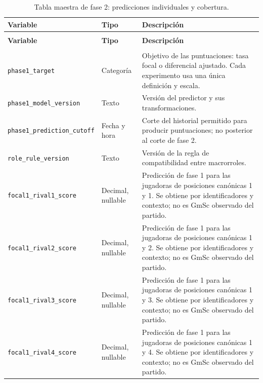 \begin{longtable}{@{}>{\raggedright\arraybackslash}p{5.0cm}>{\raggedright\arraybackslash}p{1.9cm}>{\raggedright\arraybackslash}p{7.7cm}@{}}
\caption{Tabla maestra de fase 2: predicciones individuales y cobertura.}\label{tab:fase2-predicciones}\\
\toprule\textbf{Variable}&\textbf{Tipo}&\textbf{Descripción}\\\midrule\endfirsthead
\multicolumn{3}{l}{\small Continuación de la Tabla~\ref{tab:fase2-predicciones}}\\
\toprule\textbf{Variable}&\textbf{Tipo}&\textbf{Descripción}\\\midrule\endhead
\midrule\multicolumn{3}{r}{\small Continúa en la siguiente página}\\\endfoot
\bottomrule\endlastfoot
\texttt{phase1\_\allowbreak target} & Categoría & Objetivo de las puntuaciones: tasa focal o diferencial ajustado. Cada experimento usa una única definición y escala.\\
\texttt{phase1\_\allowbreak model\_\allowbreak version} & Texto & Versión del predictor y sus transformaciones.\\
\texttt{phase1\_\allowbreak prediction\_\allowbreak cutoff} & Fecha y hora & Corte del historial permitido para producir puntuaciones; no posterior al corte de fase 2.\\
\texttt{role\_\allowbreak rule\_\allowbreak version} & Texto & Versión de la regla de compatibilidad entre macrorroles.\\
\texttt{focal1\_\allowbreak rival1\_\allowbreak score} & Decimal, nullable & Predicción de fase 1 para las jugadoras de posiciones canónicas 1 y 1. Se obtiene por identificadores y contexto; no es GmSc observado del partido.\\
\texttt{focal1\_\allowbreak rival2\_\allowbreak score} & Decimal, nullable & Predicción de fase 1 para las jugadoras de posiciones canónicas 1 y 2. Se obtiene por identificadores y contexto; no es GmSc observado del partido.\\
\texttt{focal1\_\allowbreak rival3\_\allowbreak score} & Decimal, nullable & Predicción de fase 1 para las jugadoras de posiciones canónicas 1 y 3. Se obtiene por identificadores y contexto; no es GmSc observado del partido.\\
\texttt{focal1\_\allowbreak rival4\_\allowbreak score} & Decimal, nullable & Predicción de fase 1 para las jugadoras de posiciones canónicas 1 y 4. Se obtiene por identificadores y contexto; no es GmSc observado del partido.\\

\end{longtable}
